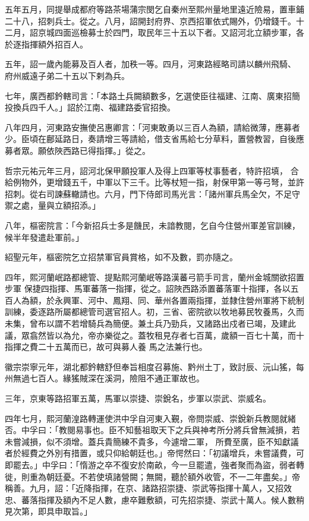 \begin{pinyinscope}
 五年五月，同提舉成都府等路茶場蒲宗閔乞自秦州至熙州量地里遠近險易，置車鋪二十八，招刺兵士。從之。八月，詔開封府界、京西招軍依式賜外，仍增錢千。十二月，詔京城四面巡檢募士於四門，取民年三十五以下者。又詔河北立額步軍，各於逐指揮額外招百人。



 五年，詔一歲內能募及百人者，加秩一等。四月，河東路經略司請以麟州飛騎、
 府州威遠子弟二十五以下剌為兵。



 七年，廣西都鈐轄司言：「本路土兵闕額數多，乞選使臣往福建、江南、廣東招簡投換兵四千人。」詔於江南、福建路委官招換。



 八年四月，河東路安撫使呂惠卿言：「河東敢勇以三百人為額，請給微薄，應募者少。臣頃在鄜延路日，奏請增三等請給，借支省馬給七分草料，置營教習，自後應募者眾。願依陜西路已得指揮。」從之。



 哲宗元祐元年三月，詔河北保甲願投軍人及得上四軍等杖事藝者，特許招填，
 合給例物外，更增錢五千，中軍以下三千。比等杖短一指，射保甲第一等弓弩，並許招刺。從右司諫蘇轍請也。六月，門下侍郎司馬光言：「諸州軍兵馬全欠，不足守禦之處，量與立額招添。」



 八年，樞密院言：「今新招兵士多是饑民，未諳教閱，乞自今住營州軍差官訓練，候半年發遣赴軍前。」



 紹聖元年，樞密院乞立招禁軍官員賞格，如不及數，罰亦隨之。



 四年，熙河蘭岷路都總管、提點熙河蘭岷等路漢蕃弓箭手司言，蘭州金城關欲招置步軍
 保捷四指揮、馬軍蕃落一指揮，從之。詔陜西路添置蕃落軍十指揮，各以五百人為額，於永興軍、河中、鳳翔、同、華州各置兩指揮，並隸住營州軍將下統制訓練，委逐路所屬都總管司選官招人。初，三省、密院欲以牧地募民牧養馬，久而未集，曾布以謂不若增騎兵為簡便。兼土兵乃勁兵，又諸路出戍者已竭，及建此議，眾翕然皆以為允，帝亦樂從之。蓋牧租見存者七百萬，歲額一百七十萬，而十指揮之費二十五萬而已，故可與募人養
 馬之法兼行也。



 徽宗崇寧元年，湖北都鈐轄舒但奉旨相度召募施、黔州土丁，致討辰、沅山猺，每州無過七百人。緣猺賊深在溪洞，險阻不通正軍故也。



 三年，京東等路招軍五萬，馬軍以崇捷、崇銳名，步軍以崇武、崇威名。



 四年七月，熙河蘭湟路轉運使洪中孚自河東入覲，帝問崇威、崇銳新兵教閱就緒否。中孚曰：「教閱易事也。臣不知藝祖取天下之兵與神考所分將兵曾無減損，若未嘗減損，似不須增。蓋兵貴簡練不貴多，今遽增二軍，
 所費至廣，臣不知獻議者於經費之外別有措置，或只仰給朝廷也。」帝愕然曰：「初議增兵，未嘗議費，可即罷去。」中孚曰：「惰游之卒不復安於南畝，今一旦罷遣，強者聚而為盜，弱者轉徙，則重為朝廷憂。不若使填諸營闕；無闕，聽於額外收管，不一二年盡矣。」帝稱善。九月，詔：「近降指揮，在京、諸路招崇捷、崇武等指揮十萬人，又招效忠、蕃落指揮及額內不足人數，慮卒難敷額，可先招崇捷、崇武十萬人。候人數稍見次第，即具申取旨。」




\end{pinyinscope}
